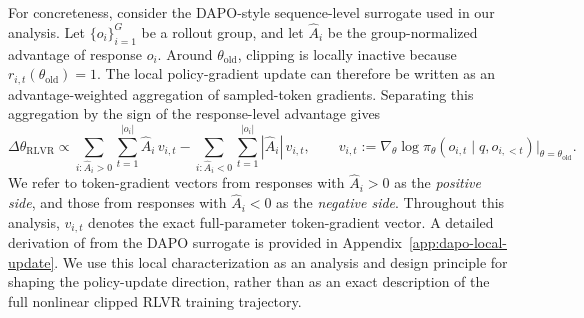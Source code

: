 \documentclass{article} %
\begin{document}
For concreteness, consider the DAPO-style sequence-level surrogate used in our analysis. 
Let \(\{o_i\}_{i=1}^G\) be a rollout group, and let \(\hat A_i\) be the group-normalized advantage of response \(o_i\). 
Around \(\theta_{\mathrm{old}}\), clipping is locally inactive because \(r_{i,t}(\theta_{\mathrm{old}})=1\). 
The local policy-gradient update can therefore be written as an advantage-weighted aggregation of sampled-token gradients. 
Separating this aggregation by the sign of the response-level advantage gives
\begin{equation}
\label{eq:local-rlvr-update}
\Delta\theta_{\mathrm{RLVR}}
\propto
\sum_{i:\hat A_i>0}\sum_{t=1}^{|o_i|}
\hat A_i\,v_{i,t}
-
\sum_{i:\hat A_i<0}\sum_{t=1}^{|o_i|}
|\hat A_i|\,v_{i,t},
\qquad
v_{i,t}:=
\nabla_\theta
\log \pi_\theta(o_{i,t}\mid q,o_{i,<t})
\Big|_{\theta=\theta_{\mathrm{old}}}.
\end{equation}
We refer to token-gradient vectors from responses with \(\hat A_i>0\) as the \emph{positive side}, and those from responses with \(\hat A_i<0\) as the \emph{negative side}. 
Throughout this analysis, \(v_{i,t}\) denotes the exact full-parameter token-gradient vector. 
A detailed derivation of  from the DAPO surrogate is provided in Appendix~\ref{app:dapo-local-update}. We use this local characterization as an analysis and design principle for shaping the policy-update direction, rather than as an exact description of the full nonlinear clipped RLVR training trajectory.
\end{document}
